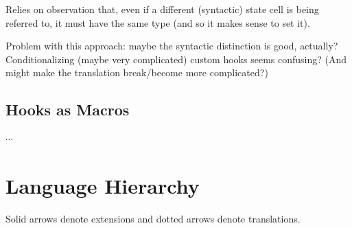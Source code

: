 \documentclass{article}
\begin{document}
Relies on observation that, even if a different
(syntactic) state cell is being referred to,
it must have the same type (and so it makes sense to set it).

Problem with this approach: maybe the syntactic distinction
is good, actually? Conditionalizing (maybe very complicated)
custom hooks seems confusing?
(And might make the translation break/become more complicated?)

\subsection{Hooks as Macros}

$\cdots$

\section{Language Hierarchy}

Solid arrows denote extensions and dotted arrows denote translations.
\end{document}
